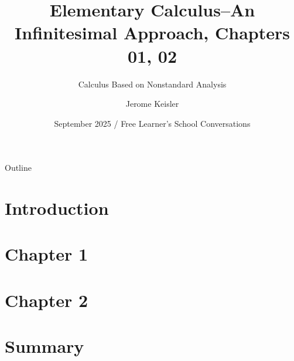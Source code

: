 \documentclass{beamer}
\title[Infinitesimal Calculus] %
{Elementary Calculus--An Infinitesimal Approach, Chapters 01, 02}
\subtitle
{Calculus Based on Nonstandard Analysis} %
\author[JK,KM] %
{Jerome Keisler\inst{1}}
\institute[Unknown] %
{
  \inst{1}%
  Original Author
}
\date[September 2025] %
{September 2025 / Free Learner's School Conversations}
\theoremstyle{definition}
\begin{document}
\begin{frame}
  \titlepage
\end{frame}

\begin{frame}{Outline}
  \tableofcontents
\end{frame}




\section{Introduction}

\section{Chapter 1}






























\section{Chapter 2}
\section{Summary}
\end{document}
